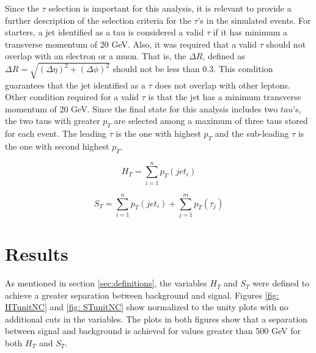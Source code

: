 \documentclass[12pt]{article}
\begin{document}
Since the $\tau$ selection is important for this analysis, it is relevant to provide a further description of the selection criteria for the $\tau$'s in the simulated events. For starters, a jet identified as a tau is considered a valid $\tau$ if it has minimum a transverse momentum of 20 GeV. Also, it was required that a valid $\tau$ should not overlap with an electron or a muon. That is, the $\Delta R$, defined as $\Delta R = \sqrt{(\Delta \eta)^2 + (\Delta \phi)^2}$ should not be less than 0.3. This condition guarantees that the jet identified as a $\tau$ does not overlap with other leptons. Other condition required for a valid $\tau$ is that the jet has a minimum transverse momentum of 20 GeV. Since the final state for this analysis includes two $tau$'s, the two taus with greater $p_{T}$ are selected among a maximum of three taus stored for each event. The leading $\tau$ is the one with highest $p_{T}$ and the sub-leading $\tau$ is the one with second highest $p_{T}$.    

\begin{equation}
 H_{T} = \sum_{i=1}^{n} p_{T}(jet_{i})
 \label{eq: HT}
\end{equation}

\begin{equation}
 S_{T} = \sum_{i=1}^{n} p_{T}(jet_{i}) + \sum_{j=1}^{m} p_{T}(\tau_{j})
 \label{eq: ST}
\end{equation}

\section{Results} \label{sec:results}

As mentioned in section \ref{sec:definitions}, the variables $H_{T}$ and $S_{T}$ were defined to achieve a greater separation between background and signal. Figures \ref{fig: HTunitNC} and \ref{fig: STunitNC} show normalized to the unity plots with no additional cuts in the variables. The plots in both figures show that a separation between signal and background is achieved for values greater than 500 GeV for both $H_{T}$ and $S_{T}$. 
\end{document}

